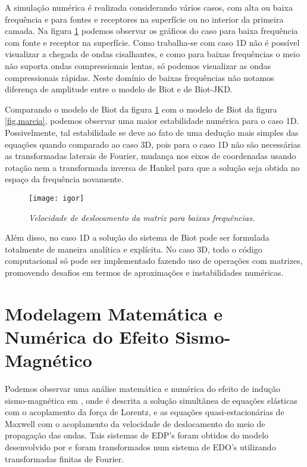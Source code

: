 A simula\c{c}\~ao num\'erica \'e realizada considerando v\'arios casos, com alta ou baixa frequ\^encia e para fontes e receptores na superf\'icie ou no interior da primeira camada. Na figura \ref{fig.igor} podemos observar os gr\'aficos do caso para baixa frequ\^encia com fonte e receptor na superf\'icie. Como trabalha-se com caso 1D n\~ao \'e poss\'ivel visualizar a chegada de ondas cisalhantes, e como para baixas frequ\^encias o meio n\~ao suporta ondas compressionais lentas, s\'o podemos visualizar as ondas compressionais r\'apidas. Neste dom\'inio de baixas frequ\^encias n\~ao notamos diferen\c{c}a de amplitude entre o modelo de Biot e de Biot-JKD. 

Comparando o modelo de Biot da figura \ref{fig.igor} com o modelo de Biot da figura \ref{fig.marcia}, podemos observar uma maior estabilidade num\'erica para o caso 1D. Possivelmente, tal estabilidade se deve ao fato de uma dedu\c{c}\~ao mais simples das equa\c{c}\~oes quando comparado ao caso 3D, pois para o caso 1D n\~ao s\~ao necess\'arias as transformadas laterais de Fourier, mudan\c{c}a nos eixos de coordenadas usando rota\c{c}\~ao nem a transformada inversa de Hankel para que a solu\c{c}\~ao seja obtida no espa\c{c}o da frequ\^encia novamente.
\begin{figure}
\centering
\texttt{[image: igor]}
\caption{\textit{Velocidade de deslocamento da matriz para baixas frequ\^encias.}}
\label{fig.igor}
\end{figure}
Al\'em disso, no caso 1D a solu\c{c}\~ao do sistema de Biot pode ser formulada totalmente de maneira anal\'itica e expl\'icita. No caso 3D, todo o c\'odigo computacional s\'o pode ser implementado fazendo uso de opera\c{c}\~oes com matrizes, promovendo desafios em termos de aproxima\c{c}\~oes e instabilidades num\'ericas.


\section{Modelagem Matem\'atica e Num\'erica do Efeito Sismo-Magn\'etico}

Podemos observar uma an\'alise matem\'atica e num\'erica do efeito de indu\c{c}\~ao sismo-magn\'etica em \cite{mikhailenko_97}, onde \'e descrita a solu\c{c}\~ao simult\^anea de equa\c{c}\~oes el\'asticas com o acoplamento da for\c{c}a de Lorentz, e as equa\c{c}\~oes quasi-estacion\'arias de Maxwell com o acoplamento da velocidade de deslocamento do meio de propaga\c{c}\~ao das ondas. Tais sistemas de EDP's foram obtidos do modelo desenvolvido por \cite{Novacki_83} e foram transformados num sistema de EDO's utilizando transformadas finitas de Fourier.

